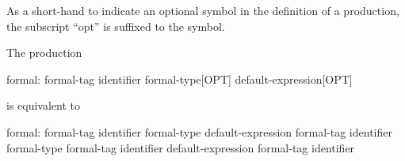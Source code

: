 As a short-hand to indicate an optional symbol in the definition of a
production, the subscript ``opt'' is suffixed to the symbol.
\begin{example}
The production
\begin{syntaxdonotcollect}
formal:
  formal-tag identifier formal-type[OPT] default-expression[OPT]
\end{syntaxdonotcollect}
is equivalent to
\begin{syntaxdonotcollect}
formal:
  formal-tag identifier formal-type default-expression
  formal-tag identifier formal-type
  formal-tag identifier default-expression
  formal-tag identifier
\end{syntaxdonotcollect}
\end{example}
